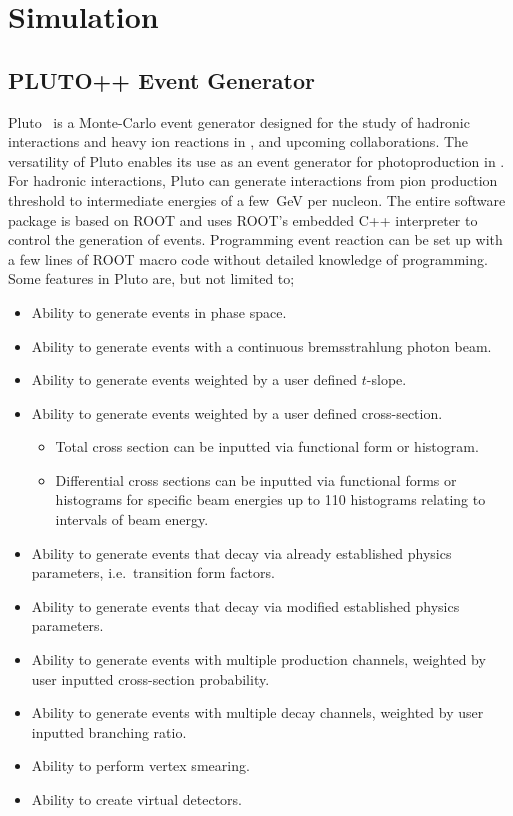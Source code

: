 \section{Simulation}

\subsection{PLUTO++ Event Generator}\label{sec:pluto}

Pluto~\cite{PLUTO} is a Monte-Carlo event generator designed for the study of hadronic interactions and heavy ion reactions in ,  and upcoming  collaborations. The versatility of Pluto enables its use as an event generator for photoproduction in . For hadronic interactions, Pluto can generate interactions from pion production threshold to intermediate energies of a few~GeV per nucleon. The entire software package is based on ROOT and uses ROOT's embedded C++ interpreter to control the generation of events. Programming event reaction can be set up with a few lines of ROOT macro code without detailed knowledge of programming. Some features in Pluto are, but not limited to;
\begin{itemize}
	\item Ability to generate events in phase space.
	\item Ability to generate events with a continuous bremsstrahlung photon beam.
	\item Ability to generate events weighted by a user defined $t$-slope.
	\item Ability to generate events weighted by a user defined cross-section.
	\begin{itemize}
		\item Total cross section can be inputted via functional form or histogram.
		\item Differential cross sections can be inputted via functional forms or histograms for specific beam energies up to 110 histograms relating to intervals of beam energy.
	\end{itemize}
	\item Ability to generate events that decay via already established physics parameters, i.e.~transition form factors.
	\item Ability to generate events that decay via modified established physics parameters.
	\item Ability to generate events with multiple production channels, weighted by user inputted cross-section probability.
	\item Ability to generate events with multiple decay channels, weighted by user inputted branching ratio.
	\item Ability to perform vertex smearing.
	\item Ability to create virtual detectors.
\end{itemize}

